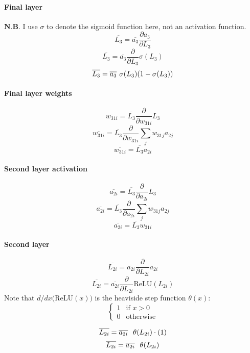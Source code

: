 \documentclass{article}
\begin{document}
\paragraph{Final layer}
$\bm{N.B.}$ I use $\sigma$ to denote the sigmoid function here, not an activation function.
\[\overline{L_3} = \overline{a_3} \frac{\partial{a_3}}{\partial{L_3}}\]
\[\overline{L_3} = \overline{a_3} \frac{\partial}{\partial{L_3}} \sigma(L_3)\]
\begin{equation}
    \overline{L_3} = \overline{a_3} \hspace{0.125cm} \sigma(L_3) (1 - \sigma(L_3))
\end{equation}
\paragraph{Final layer weights}
\[\overline{w_{31i}} = \overline{L_3} \frac{\partial}{\partial{w_{31i}}} L_3\]
\[\overline{w_{31i}} = \overline{L_3} \frac{\partial}{\partial{w_{31i}}} \sum_{j} w_{31j} a_{2j}\]
\begin{equation}
    \overline{w_{31i}} = \overline{L_3} a_{2i}
\end{equation}
\paragraph{Second layer activation}
\[\overline{a_{2i}} = \overline{L_3} \frac{\partial}{\partial{a_{2i}}} L_3\]
\[\overline{a_{2i}} = \overline{L_3} \frac{\partial}{\partial{a_{2i}}} \sum_{j} w_{31j}a_{2j}\]
\begin{equation}
    \overline{a_{2i}} = \overline{L_3} w_{31i}
\end{equation}
\paragraph{Second layer}
\[\overline{L_{2i}} = \overline{a_{2i}} \frac{\partial}{\partial{L_{2i}}} a_{2i} \]
\[\overline{L_{2i}} = \overline{a_{2i}} \frac{\partial}{\partial{L_{2i}}}\text{ReLU}(L_{2i}) \]
Note that $d/dx($ReLU$(x))$ is the heaviside step function $\theta (x)$: 
\[
\begin{cases}
    1 & \text{if } x > 0 \\
    0 & \text{otherwise}
\end{cases}
\]

\[\overline{L_{2i}} = \overline{a_{2i}} \hspace{0.25cm} \theta(L_{2i}) \cdot (1) \]
\begin{equation}
    \overline{L_{2i}} = \overline{a_{2i}} \hspace{0.25cm} \theta(L_{2i}) 
\end{equation} 
\end{document}
